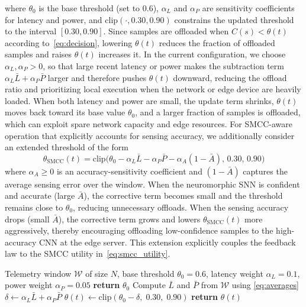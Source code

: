 \documentclass[journal]{IEEEtran}
\newcommand{\revblue}[1]{\textcolor{revblue}{#1}}
\begin{document}
\revblue{where $\theta_0$ is the base threshold (set to $0.6$),
$\alpha_L$ and $\alpha_P$ are sensitivity coefficients for latency and
power, and $\mathrm{clip}(\cdot,0.30,0.90)$ constrains the updated
threshold to the interval $[0.30,0.90]$. Since samples are offloaded
when $C(s) < \theta(t)$ according to~\eqref{eq:decision}, lowering
$\theta(t)$ reduces the fraction of offloaded samples and raises
$\theta(t)$ increases it. In the current configuration, we choose
$\alpha_L,\alpha_P>0$, so that large recent latency or power makes the
subtraction term $\alpha_L \bar{L} + \alpha_P \bar{P}$ larger and
therefore pushes $\theta(t)$ downward, reducing the offload ratio and
prioritizing local execution when the network or edge device are heavily
loaded. When both latency and power are small, the update term shrinks,
$\theta(t)$ moves back toward its base value $\theta_0$, and a larger
fraction of samples is offloaded, which can exploit spare network
capacity and edge resources.}
\revblue{For SMCC-aware operation that explicitly accounts for sensing
accuracy, we additionally consider an extended threshold of the form}
\revblue{
\begin{equation}
\theta_{\text{SMCC}}(t)
= \mathrm{clip}\big(
\theta_0 - \alpha_L \bar{L} - \alpha_P \bar{P}
- \alpha_A (1-\bar{A}),\,0.30,\,0.90\big)
\label{eq:theta_smcc}
\end{equation}
}
\revblue{where $\alpha_A \geq 0$ is an accuracy-sensitivity coefficient
and $(1-\bar{A})$ captures the average sensing error over the window.
When the neuromorphic SNN is confident and accurate (large $\bar{A}$),
the corrective term becomes small and the threshold remains close to
$\theta_0$, reducing unnecessary offloads. When the sensing accuracy
drops (small $\bar{A}$), the corrective term grows and lowers
$\theta_{\text{SMCC}}(t)$ more aggressively, thereby encouraging
offloading low-confidence samples to the high-accuracy CNN at the edge
server. This extension explicitly couples the feedback law to the SMCC
utility in~\eqref{eq:smcc_utility}.}



\begin{algorithm}[!t]
\caption{NSSON Adaptive Feedback Threshold Update}
\label{alg:feedback}
\begin{algorithmic}[1]
\REQUIRE Telemetry window $\mathcal{W}$ of size $N$,
         base threshold $\theta_0 = 0.6$,
         latency weight $\alpha_L = 0.1$,
         power weight $\alpha_P = 0.05$
  \STATE \textbf{return} $\theta_0$ 
\ENDIF
\STATE Compute $\bar{L}$ and $\bar{P}$ from $\mathcal{W}$ using \eqref{eq:averages}
\STATE $\delta \leftarrow \alpha_L \bar{L} + \alpha_P \bar{P}$
\STATE $\theta(t) \leftarrow \mathrm{clip}(\theta_0 - \delta,\; 0.30,\; 0.90)$
\STATE \textbf{return} $\theta(t)$
\end{algorithmic}
\end{algorithm}
\end{document}
